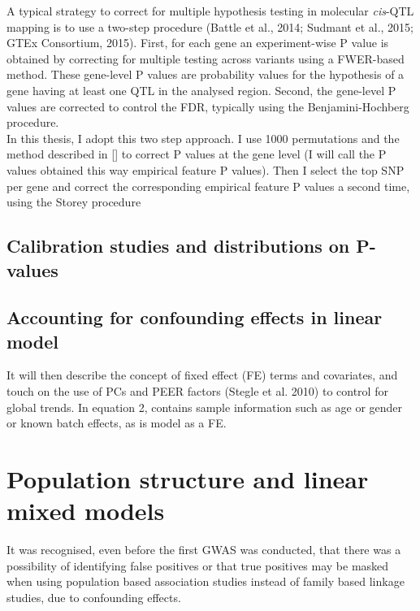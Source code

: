 A typical strategy to correct for multiple hypothesis testing in molecular  \textit{cis}-QTL mapping is to use a two-step procedure (Battle et al., 2014; Sudmant et al., 2015; GTEx
Consortium, 2015). 
First, for each gene an experiment-wise P value is obtained by correcting for multiple testing across variants using a FWER-based method. 
These gene-level P values are probability values for the hypothesis of a gene having at least
one QTL in the analysed region. 
Second, the gene-level P values are corrected to control the FDR, typically using the Benjamini-Hochberg procedure.\\

In this thesis, I adopt this two step approach.
I use 1000 permutations and the method described in [] to correct P values at the gene level (I will call the P values obtained this way empirical feature P values).
Then I select the top SNP per gene and correct the corresponding empirical feature P values a second time, using the Storey procedure

\subsection{Calibration studies and distributions on P-values}

\subsection{Accounting for confounding effects in linear model}

It will then describe the concept of fixed effect (FE) terms and covariates, and touch on the use of PCs and PEER factors (Stegle et al. 2010) to control for global trends. 
In equation 2,  contains sample information such as age or gender or known batch effects, as is model as a FE.


\section{Population structure and linear mixed models}

It was recognised, even before the first GWAS was conducted, that there was a possibility of identifying false positives or that true positives may be masked when using population based association studies instead of family based linkage studies, due to confounding effects. 

